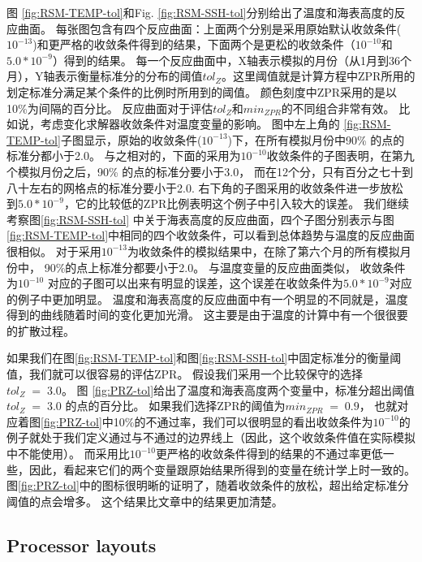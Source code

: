  
图 \ref{fig:RSM-TEMP-tol}和Fig. \ref{fig:RSM-SSH-tol}分别给出了温度和海表高度的反应曲面。 
每张图包含有四个反应曲面：上面两个分别是采用原始默认收敛条件($10^{-13}$)和更严格的收敛条件得到的结果，下面两个是更松的收敛条件（$10^{-10}$和$5.0*10^{-9}$）得到的结果。 
每一个反应曲面中，X轴表示模拟的月份（从1月到36个月），Y轴表示衡量标准分的分布的阈值$tol_{Z}$。这里阈值就是计算方程中ZPR所用的划定标准分满足某个条件的比例时所用到的阈值。
颜色刻度中ZPR采用的是以10\%为间隔的百分比。 
反应曲面对于评估$tol_{Z}$和$min_{ZPR}$的不同组合非常有效。
比如说，考虑变化求解器收敛条件对温度变量的影响。 图中左上角的 \ref{fig:RSM-TEMP-tol}子图显示，原始的收敛条件($10^{-13}$)下，在所有模拟月份中90\% 的点的标准分都小于2.0。
与之相对的，下面的采用为$10^{-10}$收敛条件的子图表明，在第九个模拟月份之后，90\% 的点的标准分要小于3.0， 而在12个分，只有百分之七十到八十左右的网格点的标准分要小于2.0. 
右下角的子图采用的收敛条件进一步放松 到$5.0*10^{-9}$，它的比较低的ZPR比例表明这个例子中引入较大的误差。
我们继续考察图\ref{fig:RSM-SSH-tol} 中关于海表高度的反应曲面，四个子图分别表示与图\ref{fig:RSM-TEMP-tol}中相同的四个收敛条件，可以看到总体趋势与温度的反应曲面很相似。 
对于采用$10^{-13}$为收敛条件的模拟结果中，在除了第六个月的所有模拟月份中， 90\%的点上标准分都要小于2.0。 
与温度变量的反应曲面类似， 收敛条件为$10^{-10}$ 对应的子图可以出来有明显的误差，这个误差在收敛条件为$5.0*10^{-9}$对应的例子中更加明显。 
温度和海表高度的反应曲面中有一个明显的不同就是，温度得到的曲线随着时间的变化更加光滑。 这主要是由于温度的计算中有一个很很要的扩散过程。

 

如果我们在图\ref{fig:RSM-TEMP-tol}和图\ref{fig:RSM-SSH-tol}中固定标准分的衡量阈值，我们就可以很容易的评估ZPR。 
假设我们采用一个比较保守的选择$tol_{Z} \; = \; 3.0$。 
图 \ref{fig:PRZ-tol}给出了温度和海表高度两个变量中，标准分超出阈值 $tol_{Z} \; = \; 3.0$ 的点的百分比。 
如果我们选择ZPR的阈值为$min_{ZPR} \; = \; 0.9$， 也就对应着图\ref{fig:PRZ-tol}中10\%的不通过率，我们可以很明显的看出收敛条件为$10^{-10}$的例子就处于我们定义通过与不通过的边界线上（因此，这个收敛条件值在实际模拟中不能使用）。 
而采用比$10^{-10}$更严格的收敛条件得到的结果的不通过率更低一些，因此，看起来它们的两个变量跟原始结果所得到的变量在统计学上时一致的。
图\ref{fig:PRZ-tol}中的图标很明晰的证明了，随着收敛条件的放松，超出给定标准分阈值的点会增多。 
这个结果比文章\cite{yong2015}中的结果更加清楚。 


\subsection{Processor layouts}

